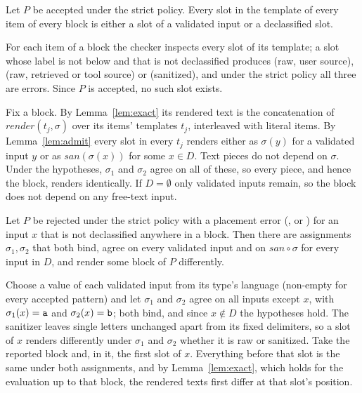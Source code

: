 \documentclass[journal]{IEEEtran}
\begin{document}
\begin{lemma}\label{lem:admit}
Let $P$ be accepted under the strict policy. Every slot in the template of every item of every  block is either a slot of a validated input or a declassified slot.
\end{lemma}
\begin{IEEEproof}
For each item of a  block the checker inspects every slot of its template; a slot whose label is not below  and that is not declassified produces  (raw, user source),  (raw, retrieved or tool source) or  (sanitized), and under the strict policy all three are errors. Since $P$ is accepted, no such slot exists.
\end{IEEEproof}

\begin{IEEEproof}
Fix a  block. By Lemma~\ref{lem:exact} its rendered text is the concatenation of $\mathit{render}(t_j,\sigma)$ over its items' templates $t_j$, interleaved with literal items. By Lemma~\ref{lem:admit} every slot in every $t_j$ renders either as $\sigma(y)$ for a validated input $y$ or as $\mathit{san}(\sigma(x))$ for some $x \in D$. Text pieces do not depend on $\sigma$. Under the hypotheses, $\sigma_1$ and $\sigma_2$ agree on all of these, so every piece, and hence the block, renders identically. If $D=\emptyset$ only validated inputs remain, so the block does not depend on any free-text input.
\end{IEEEproof}

\begin{theorem}[Completeness]\label{thm:complete}
Let $P$ be rejected under the strict policy with a placement error (,  or ) for an input $x$ that is not declassified anywhere in a  block. Then there are assignments $\sigma_1,\sigma_2$ that both bind, agree on every validated input and on $\mathit{san}\circ\sigma$ for every input in $D$, and render some  block of $P$ differently.
\end{theorem}
\begin{IEEEproof}
Choose a value of each validated input from its type's language (non-empty for every accepted pattern) and let $\sigma_1$ and $\sigma_2$ agree on all inputs except $x$, with $\sigma_1(x) = \texttt{a}$ and $\sigma_2(x) = \texttt{b}$; both bind, and since $x \notin D$ the hypotheses hold. The sanitizer leaves single letters unchanged apart from its fixed delimiters, so a slot of $x$ renders differently under $\sigma_1$ and $\sigma_2$ whether it is raw or sanitized. Take the reported block and, in it, the first slot of $x$. Everything before that slot is the same under both assignments, and by Lemma~\ref{lem:exact}, which holds for the evaluation up to that block, the rendered texts first differ at that slot's position.
\end{IEEEproof}
\end{document}
